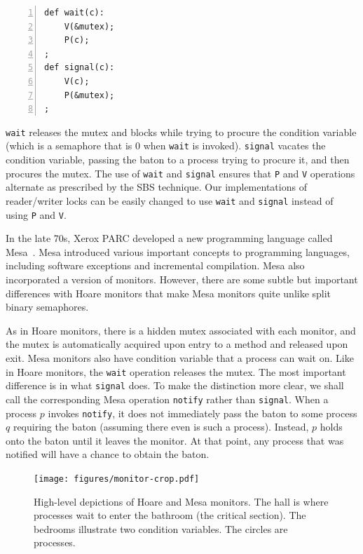 \documentclass{report}
\newenvironment{code}{
\tcolorbox
}{
\endtcolorbox
}
\begin{document}
\begin{code} 
\begin{Verbatim}[xleftmargin=5mm,numbers=left]
def wait(c):
    V(&mutex);
    P(c);
;
def signal(c):
    V(c);
    P(&mutex);
;
\end{Verbatim} 
\end{code} 

\texttt{wait} releases the mutex and blocks while trying
to procure the condition variable (which is a semaphore that is 0 when
\texttt{wait} is invoked).
\texttt{signal} vacates the condition variable, passing the baton to
a process trying to procure it, and then procures the mutex.
The use of \texttt{wait} and \texttt{signal} ensures that \texttt{P} and
\texttt{V} operations alternate as prescribed by the SBS technique.
Our implementations of reader/writer locks can be easily changed to
use \texttt{wait} and \texttt{signal} instead of using \texttt{P}
and \texttt{V}.

In the late 70s, Xerox PARC developed a new programming language called
Mesa~\cite{LR80}.
Mesa introduced various important concepts to programming languages,
including software exceptions and incremental compilation.  Mesa also
incorporated a version of monitors.
However, there are some subtle but important differences with Hoare
monitors that make Mesa monitors quite unlike split binary semaphores.

As in Hoare monitors, there is a hidden mutex associated with each monitor,
and the mutex is automatically acquired upon entry to a method and released
upon exit.
Mesa monitors also have condition variable that a process can wait on.
Like in Hoare monitors, the \texttt{wait} operation releases the mutex.
The most important difference is in what \texttt{signal} does.
To make the distinction more clear, we shall call the corresponding Mesa
operation \texttt{notify} rather than \texttt{signal}.
When a process $p$ invokes \texttt{notify}, it does not immediately pass 
the baton to some process $q$ requiring the baton (assuming there even
is such a process).  Instead, $p$ holds onto
the baton until it leaves the monitor.  At that point, any process that
was notified will have a chance to obtain the baton.

\begin{figure}
\begin{center}
\texttt{[image: figures/monitor-crop.pdf]}
\end{center}
\caption{High-level depictions of Hoare and Mesa monitors.  The hall is
where processes wait to enter the bathroom (the critical section).  The
bedrooms illustrate two condition variables.  The circles are processes.}
\label{fig:monitors}
\end{figure}
\end{document}
